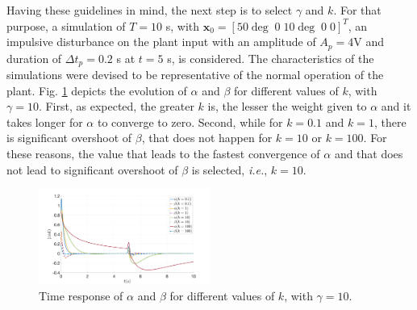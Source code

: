 \documentclass[letterpaper, 10 pt, conference]{ieeeconf}
\begin{document}
Having these guidelines in mind, the next step is to select $\gamma$ and $k$. For that purpose, a simulation of $T = 10$ s, with $\mathbf{x}_0 = [50\deg\;0 \;10\deg\; 0 \;0]^T$, an impulsive disturbance on the plant input with an amplitude of $A_p = 4$V and duration of $\Delta t_p = 0.2$ s at $t = 5$ s, is considered. The characteristics of the simulations were devised to be representative of the normal operation of the plant. Fig. \ref{fig:LQR_k} depicts the evolution of $\alpha$ and $\beta$ for different values of $k$, with $\gamma = 10$. First, as expected, the greater $k$ is, the lesser the weight given to $\alpha$ and it takes longer for $\alpha$ to converge to zero. Second, while for $k = 0.1$ and $k= 1$, there is significant overshoot of $\beta$, that does not happen for $k = 10$ or $k=100$. For these reasons, the value that leads to the fastest convergence of $\alpha$ and that does not lead to significant overshoot of $\beta$ is selected, \textit{i.e.}, $k = 10$. 
\begin{figure}[h]
    \centering
    \includegraphics[width = 0.5\textwidth]{figures/LQR_k.png}
    \caption{Time response of $\alpha$ and $\beta$ for different values of $k$, with $\gamma = 10$.}
    \label{fig:LQR_k}
\end{figure}

\end{document}
